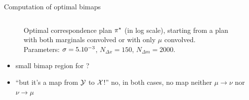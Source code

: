 \documentclass[9pt,xcolor={dvipsnames}]{beamer}
\begin{document}
\begin{frame}{Computation of optimal bimaps}
    \begin{columns}
        \centering
        \begin{column}[b]{.4\linewidth}
            \centering
            
            \vspace{-8mm}
        \end{column}
        \hfill
        \begin{column}[b]{.49\linewidth}
            \centering
            
            \vspace{-8mm}
        \end{column}
    \end{columns}
    \begin{figure}[h]
            \caption{Optimal correspondence plan $\pi^\star$ (in log scale), \capleft starting from a plan with both marginals convolved or \capright with only $\mu$ convolved. Parameters: $\sigma=\smash{5.10^{-3}}$, $N_{\Delta x}=150$, $N_{\Delta m}=2000$.
            }
    \end{figure}
    \vspace{-1cm}
    \begin{itemize}
        \item small bimap region for \capright?
        \item ``but it's a map from $\mathcal{Y}$ to $\mathcal{X}$!'' no, in both cases, no map neither $\mu\to\nu$ nor $\nu\to\mu$
    \end{itemize}
\end{frame}
\end{document}
